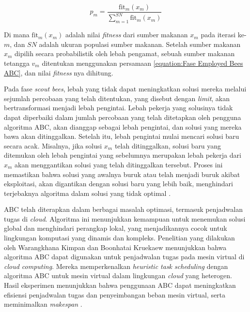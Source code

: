 \begin{equation}
\label{equation:Fase Onlooker Bees ABC}
    p_m = \frac{\text{fit}_m(x_m)}{\sum_{m=1}^{SN} \text{fit}_m(x_m)}
\end{equation}

Di mana \(\text{fit}_m(x_m)\) adalah nilai \textit{fitness} dari sumber makanan \(x_m\) pada iterasi ke-\(m\), dan \(SN\) adalah ukuran populasi sumber makanan. Setelah sumber makanan \(x_m\) dipilih secara probabilistik oleh lebah pengamat, sebuah sumber makanan tetangga \(v_m\) ditentukan menggunakan persamaan \ref{equation:Fase Employed Bees ABC}, dan nilai \textit{fitness} nya dihitung.

Pada fase \textit{scout bees}, lebah yang tidak dapat meningkatkan solusi mereka melalui sejumlah percobaan yang telah ditentukan, yang disebut dengan \textit{limit}, akan bertransformasi menjadi lebah pengintai. Lebah pekerja yang solusinya tidak dapat diperbaiki dalam jumlah percobaan yang telah ditetapkan oleh pengguna algoritma ABC, akan dianggap sebagai lebah pengintai, dan solusi yang mereka bawa akan ditinggalkan. Setelah itu, lebah pengintai mulai mencari solusi baru secara acak. Misalnya, jika solusi \( x_m \) telah ditinggalkan, solusi baru yang ditemukan oleh lebah pengintai yang sebelumnya merupakan lebah pekerja dari \( x_m \) akan menggantikan solusi yang telah ditinggalkan tersebut. Proses ini memastikan bahwa solusi yang awalnya buruk atau telah menjadi buruk akibat eksploitasi, akan digantikan dengan solusi baru yang lebih baik, menghindari terjebaknya algoritma dalam solusi yang tidak optimal \parencite{Karaboga2010}. 

ABC telah diterapkan dalam berbagai masalah optimasi, termasuk penjadwalan tugas di \textit{cloud}. Algoritma ini menunjukkan kemampuan untuk menemukan solusi global dan menghindari perangkap lokal, yang menjadikannya cocok untuk lingkungan komputasi yang dinamis dan kompleks. Penelitian yang dilakukan oleh Warangkhana Kimpan dan Boonhatai Kruekaew menunjukkan bahwa algoritma ABC dapat digunakan untuk penjadwalan tugas pada mesin virtual di \textit{cloud computing}. Mereka memperkenalkan \textit{heuristic task scheduling} dengan algoritma ABC untuk mesin virtual dalam lingkungan \textit{cloud} yang heterogen. Hasil eksperimen menunjukkan bahwa penggunaan ABC dapat meningkatkan efisiensi penjadwalan tugas dan penyeimbangan beban mesin virtual, serta meminimalkan \textit{makespan} \parencite{Kimpan2016}.


